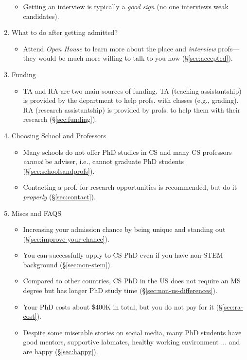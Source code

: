 \documentclass[11pt]{article}
\begin{document}
\begin{enumerate}
\begin{itemize}
    \item Getting an interview is typically a \emph{good sign} (no one interviews weak candidates).
\end{itemize}
\item What to do after getting admitted?
\begin{itemize}
    \item Attend \emph{Open House} to learn more about the place and \emph{interview} profs---they would be much more willing to talk to you now (\S\ref{sec:accepted}).
\end{itemize}
\item Funding
\begin{itemize}
    \item TA and RA are two main sources of funding.  TA (teaching assistantship) is provided by the department to help profs. with classes (e.g., grading). RA (research assistantship) is provided by profs. to help them with their research (\S\ref{sec:funding}).
\end{itemize}
\item Choosing School and Professors
\begin{itemize}
    \item Many schools do not offer PhD studies in CS and many CS professors \emph{cannot} be adviser, i.e., cannot graduate PhD students  (\S\ref{sec:schoolsandprofs}).
    \item Contacting a prof. for research opportunities is recommended, but do it \emph{properly} (\S\ref{sec:contact}).
\end{itemize}
\item Miscs and FAQS
\begin{itemize}
    \item Increasing your admission chance by being unique and standing out (\S\ref{sec:improve-your-chance}).
    \item You can successfully apply to CS PhD even if you have non-STEM background (\S\ref{sec:non-stem}).
    \item Compared to other countries, CS PhD in the US does not require an MS degree but has longer PhD study time (\S\ref{sec:non-us-differences}).
    \item Your PhD costs about \$400K in total, but you do not pay for it (\S\ref{sec:ra-cost}).
    \item Despite some miserable stories on social media, many PhD students have good mentors, supportive labmates, healthy working environment ... and are happy (\S\ref{sec:happy}).
\end{itemize}
\end{enumerate}
\end{document}
